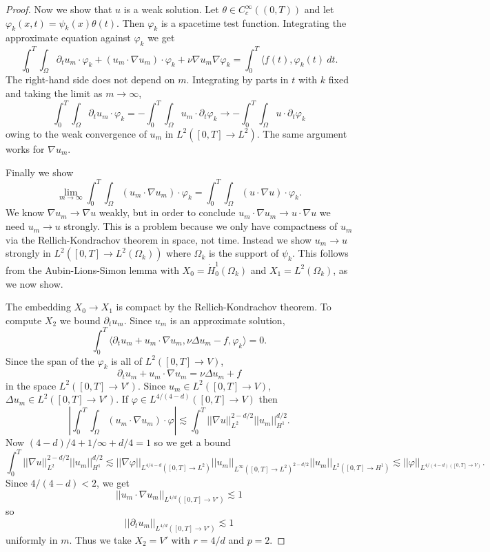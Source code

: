 \documentclass[12pt]{book}
\theoremstyle{definition}
\begin{document}
\begin{proof}
Now we show that $u$ is a weak solution. Let $\theta \in C^\infty_c((0, T))$ and let $\varphi_k(x, t) = \psi_k(x) \theta(t)$.
Then $\varphi_k$ is a spacetime test function.
Integrating the approximate equation against $\varphi_k$ we get
$$\int_0^T \int_\Omega \partial_t u_m \cdot \varphi_k + (u_m \cdot \nabla u_m) \cdot \varphi_k + \nu \nabla u_m \nabla \varphi_k = \int_0^T \langle f(t), \varphi_k(t) ~dt.$$
The right-hand side does not depend on $m$.
Integrating by parts in $t$ with $k$ fixed and taking the limit as $m \to \infty$,
$$\int_0^T \int_\Omega \partial_t u_m \cdot \varphi_k = -\int_0^T \int_\Omega u_m \cdot \partial_t \varphi_k \to -\int_0^T \int_\Omega u \cdot \partial_t \varphi_k$$
owing to the weak convergence of $u_m$ in $L^2([0, T] \to L^2)$.
The same argument works for $\nabla u_m$.

Finally we show
$$\lim_{m \to \infty} \int_0^T \int_\Omega (u_m \cdot \nabla u_m) \cdot \varphi_k = \int_0^T \int_\Omega (u \cdot \nabla u) \cdot \varphi_k.$$
We know $\nabla u_m \to \nabla u$ weakly, but in order to conclude $u_m \cdot \nabla u_m \to u \cdot \nabla u$ we need $u_m \to u$ strongly.
This is a problem because we only have compactness of $u_m$ via the Rellich-Kondrachov theorem in space, not time.
Instead we show $u_m \to u$ strongly in $L^2([0, T] \to L^2(\Omega_k))$ where $\Omega_k$ is the support of $\psi_k$.
This follows from the Aubin-Lions-Simon lemma with $X_0 = \dot H^1_0(\Omega_k)$ and $X_1 = L^2(\Omega_k)$, as we now show.

The embedding $X_0 \to X_1$ is compact by the Rellich-Kondrachov theorem.
To compute $X_2$ we bound $\partial_t u_m$.
Since $u_m$ is an approximate solution,
$$\int_0^T \langle \partial_t u_m + u_m \cdot \nabla u_m, \nu \Delta u_m - f, \varphi_k\rangle = 0.$$
Since the span of the $\varphi_k$ is all of $L^2([0, T] \to V)$,
$$\partial_t u_m + u_m \cdot \nabla u_m = \nu \Delta u_m + f$$
in the space $L^2([0, T] \to V')$.
Since $u_m \in L^2([0, T] \to V)$, $\Delta u_m \in L^2([0, T] \to V')$.
If $\varphi \in L^{4/(4-d)}([0, T] \to V)$ then
$$\left|\int_0^T \int_\Omega (u_m \cdot \nabla u_m) \cdot \varphi\right| \lesssim \int_0^T ||\nabla u||_{L^2}^{2-d/2} ||u_m||_{H^1}^{d/2}.$$
Now $(4-d)/4+1/\infty+d/4=1$ so we get a bound
$$ \int_0^T ||\nabla u||_{L^2}^{2-d/2} ||u_m||_{H^1}^{d/2} \lesssim ||\nabla \varphi||_{L^{4/4-d}([0, T] \to L^2)} ||u_m||_{L^\infty([0, T] \to L^2)^{2-d/2}} ||u_m||_{L^2([0, T] \to H^1)} \lesssim ||\varphi||_{L^{4/(4-d)([0, T] \to V)}}.$$
Since $4/(4-d) < 2$, we get
$$||u_m \cdot \nabla u_m||_{L^{4/d}([0, T] \to V')} \lesssim 1$$
so
$$||\partial_t u_m||_{L^{4/d}([0, T] \to V')} \lesssim 1$$
uniformly in $m$.
Thus we take $X_2 = V'$ with $r = 4/d$ and $p = 2$.


\end{proof}
\end{document}
